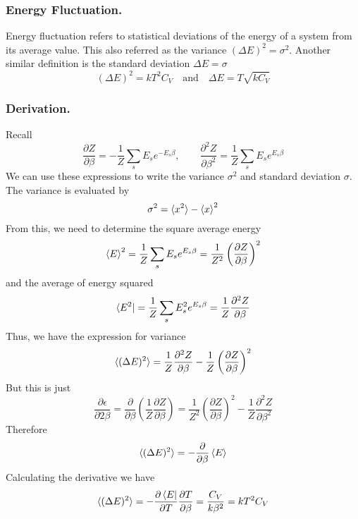 \documentclass[../../../Main.tex]{subfiles}
\begin{document}
\subsubsection{Energy Fluctuation.}
Energy fluctuation refers to statistical deviations of the energy of a system from its average value.
This also referred as the variance $(\Delta E)^2=\sigma^2$.
Another similar definition is the standard deviation $\Delta E=\sigma$
\begin{equation*}
	(\Delta E)^2=kT^2C_V\quad\text{and}\quad \Delta E=T\sqrt{kC_V}
\end{equation*}

\subsubsection{Derivation.}
Recall 
\begin{equation*}
	\frac{\partial Z}{\partial \beta}=-\frac{1}{Z}\sum_sE_se^{-E_s\beta},\qquad\frac{\partial^2Z}{\partial \beta^2}=\frac{1}{Z}\sum_sE_se^{E_s\beta}
\end{equation*}
We can use these expressions to write the variance $\sigma^2$ and standard deviation $\sigma$. 
The variance is evaluated by
\begin{equation*}
	\sigma^2=\braket{x^2}-\braket{x}^2
\end{equation*}
From this, we need to determine the square average energy 
\begin{equation*}
	\braket{E}^2=\frac{1}{Z}\sum_s E_se^{E_s\beta}=\frac{1}{Z^2}\left(\frac{\partial Z}{\partial \beta}\right)^2
\end{equation*}
and the average of energy squared
\begin{equation*}
	\bra{E^2}=\frac{1}{Z}\sum_sE_s^2e^{E_s\beta}=\frac{1}{Z}\frac{\partial^2Z}{\partial\beta}
\end{equation*}
Thus, we have the expression for variance
\begin{equation*}
	\braket{(\Delta E)^2}=\frac{1}{Z}\frac{\partial^2Z}{\partial\beta}-\frac{1}{Z}\left(\frac{\partial Z}{\partial \beta}\right)^2
\end{equation*}
But this is just 
\begin{equation*}
	\frac{\partial \epsilon}{\partial 2\beta}=\frac{\partial}{\partial \beta}\left(\frac{1}{Z}\frac{\partial Z}{\partial \beta}\right)=\frac{1}{Z^2}\left(\frac{\partial Z}{\partial \beta}\right)^2-\frac{1}{Z}\frac{\partial^2Z}{\partial\beta^2}
\end{equation*}
Therefore
\begin{equation*}
	\braket{(\Delta E )^2}=-\frac{\partial }{\partial\beta}\braket{E}
\end{equation*}
Calculating the derivative we have 
\begin{equation*}
	\braket{(\Delta E )^2}=-\frac{\partial\bra{E}}{\partial T}\frac{\partial T}{\partial \beta}=\frac{C_V}{k\beta^2}=kT^2C_V
\end{equation*}
\end{document}
